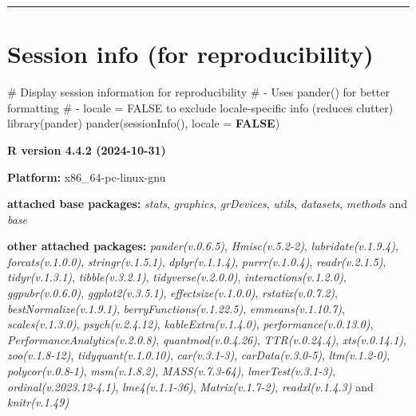 \documentclass[
  bookmarksnumbered]{article}
\newenvironment{Shaded}{\begin{snugshade}}{\end{snugshade}}
\newcommand{\AttributeTok}[1]{\textcolor[rgb]{0.80,0.80,0.80}{#1}}
\newcommand{\CommentTok}[1]{\textcolor[rgb]{0.50,0.62,0.50}{#1}}
\newcommand{\ConstantTok}[1]{\textcolor[rgb]{0.86,0.64,0.64}{\textbf{#1}}}
\newcommand{\FunctionTok}[1]{\textcolor[rgb]{0.94,0.94,0.56}{#1}}
\newcommand{\NormalTok}[1]{\textcolor[rgb]{0.80,0.80,0.80}{#1}}
\begin{document}
\begin{center}\rule{0.5\linewidth}{0.5pt}\end{center}

\section{Session info (for reproducibility)}\label{session}

\begin{Shaded}
\begin{Highlighting}[]
\CommentTok{\# Display session information for reproducibility}
\CommentTok{\# {-} Uses \textasciigrave{}pander()\textasciigrave{} for better formatting}
\CommentTok{\# {-} \textasciigrave{}locale = FALSE\textasciigrave{} to exclude locale{-}specific info (reduces clutter)}
\FunctionTok{library}\NormalTok{(pander)}
\FunctionTok{pander}\NormalTok{(}\FunctionTok{sessionInfo}\NormalTok{(), }\AttributeTok{locale =} \ConstantTok{FALSE}\NormalTok{)}
\end{Highlighting}
\end{Shaded}

\textbf{R version 4.4.2 (2024-10-31)}

\textbf{Platform:} x86\_64-pc-linux-gnu

\textbf{attached base packages:}
\emph{stats}, \emph{graphics}, \emph{grDevices}, \emph{utils}, \emph{datasets}, \emph{methods} and \emph{base}

\textbf{other attached packages:}
\emph{pander(v.0.6.5)}, \emph{Hmisc(v.5.2-2)}, \emph{lubridate(v.1.9.4)}, \emph{forcats(v.1.0.0)}, \emph{stringr(v.1.5.1)}, \emph{dplyr(v.1.1.4)}, \emph{purrr(v.1.0.4)}, \emph{readr(v.2.1.5)}, \emph{tidyr(v.1.3.1)}, \emph{tibble(v.3.2.1)}, \emph{tidyverse(v.2.0.0)}, \emph{interactions(v.1.2.0)}, \emph{ggpubr(v.0.6.0)}, \emph{ggplot2(v.3.5.1)}, \emph{effectsize(v.1.0.0)}, \emph{rstatix(v.0.7.2)}, \emph{bestNormalize(v.1.9.1)}, \emph{berryFunctions(v.1.22.5)}, \emph{emmeans(v.1.10.7)}, \emph{scales(v.1.3.0)}, \emph{psych(v.2.4.12)}, \emph{kableExtra(v.1.4.0)}, \emph{performance(v.0.13.0)}, \emph{PerformanceAnalytics(v.2.0.8)}, \emph{quantmod(v.0.4.26)}, \emph{TTR(v.0.24.4)}, \emph{xts(v.0.14.1)}, \emph{zoo(v.1.8-12)}, \emph{tidyquant(v.1.0.10)}, \emph{car(v.3.1-3)}, \emph{carData(v.3.0-5)}, \emph{ltm(v.1.2-0)}, \emph{polycor(v.0.8-1)}, \emph{msm(v.1.8.2)}, \emph{MASS(v.7.3-64)}, \emph{lmerTest(v.3.1-3)}, \emph{ordinal(v.2023.12-4.1)}, \emph{lme4(v.1.1-36)}, \emph{Matrix(v.1.7-2)}, \emph{readxl(v.1.4.3)} and \emph{knitr(v.1.49)}
\end{document}
